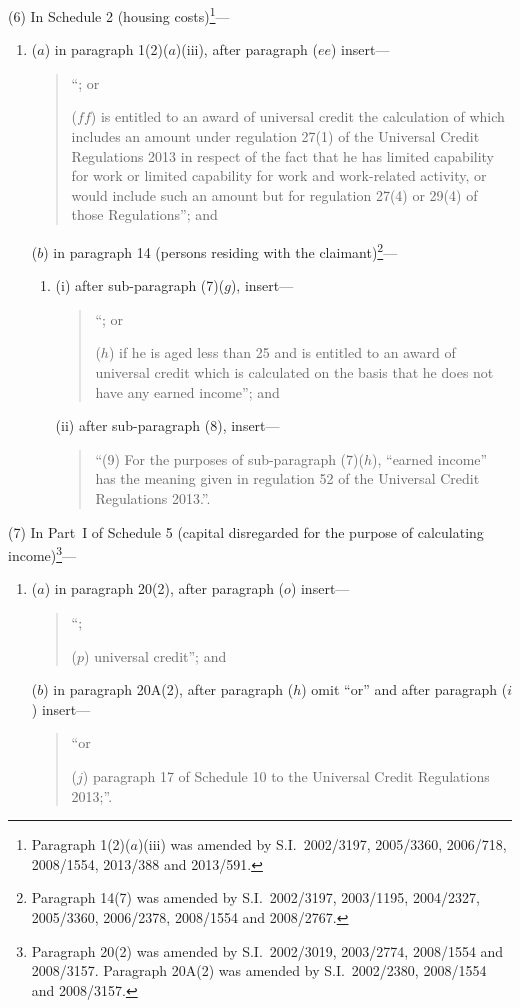 \documentclass[12pt,a4paper]{article}
\begin{document}
(6) In Schedule 2 (housing costs)\footnote{Paragraph 1(2)($a$)(iii) was amended by S.I.~2002/3197, 2005/3360, 2006/718, 2008/1554, 2013/388 and 2013/591.}—
\begin{enumerate}\item[]
($a$) in paragraph 1(2)($a$)(iii), after paragraph ($ee$)  insert—
\begin{quotation}
“; or

($ff$)  is entitled to an award of universal credit the calculation of which includes an amount under regulation 27(1) of the Universal Credit Regulations 2013 in respect of the fact that he has limited capability for work or limited capability for work and work-related activity, or would include such an amount but for regulation 27(4) or 29(4) of those Regulations”; and
\end{quotation}

($b$) in paragraph 14 (persons residing with the claimant)\footnote{Paragraph 14(7) was amended by S.I.~2002/3197, 2003/1195, 2004/2327, 2005/3360, 2006/2378, 2008/1554 and 2008/2767.}—
\begin{enumerate}\item[]
(i) after sub-paragraph (7)($g$), insert—
\begin{quotation}
“; or

($h$) if he is aged less than 25 and is entitled to an award of universal credit which is calculated on the basis that he does not have any earned income”; and
\end{quotation}

(ii) after sub-paragraph (8), insert—
\begin{quotation}
“(9) For the purposes of sub-paragraph (7)($h$), “earned income” has the meaning given in regulation 52 of the Universal Credit Regulations 2013.”.
\end{quotation}
\end{enumerate}
\end{enumerate}

(7) In Part~I of Schedule 5 (capital disregarded for the purpose of calculating income)\footnote{Paragraph 20(2) was amended by S.I.~2002\slash 3019, 2003/2774, 2008/1554 and 2008/3157. Paragraph 20A(2) was amended by S.I.~2002/2380, 2008/1554 and 2008/3157.}—
\begin{enumerate}\item[]
($a$) in paragraph 20(2), after paragraph ($o$)  insert—
\begin{quotation}
“;

($p$) universal credit”; and
\end{quotation}

($b$) in paragraph 20A(2), after paragraph ($h$)  omit “or” and after paragraph ($i$)  insert—
\begin{quotation}
“or 

($j$)  paragraph 17 of Schedule 10 to the Universal Credit Regulations 2013;”.
\end{quotation}
\end{enumerate}
\end{document}
